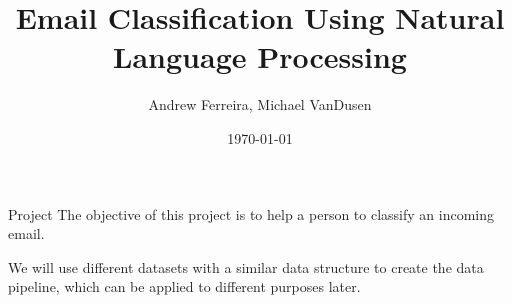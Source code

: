 \documentclass{beamer}
\title{Email Classification Using Natural Language Processing}
\author{Andrew Ferreira, Michael VanDusen}
\date{\today}
\begin{document}
\begin{frame}
    \titlepage
\end{frame}


\begin{frame}{Project}
The objective of this project is to help a person to classify an incoming email. 

We will use different datasets with a similar data structure to create the data pipeline, which can be applied to different purposes later. 
\end{frame}
\end{document}

